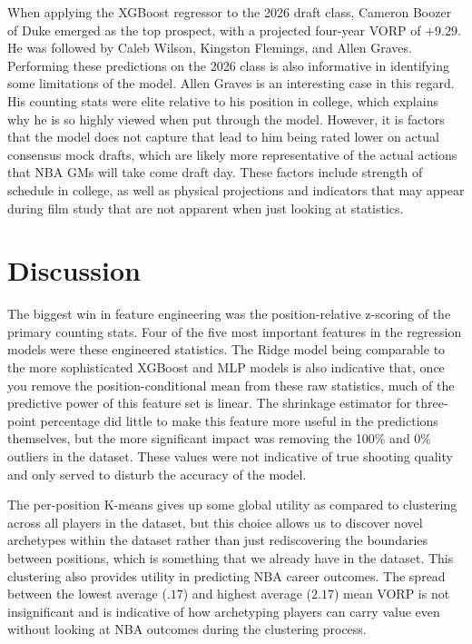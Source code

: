 \documentclass[conference]{IEEEtran}
\begin{document}
When applying the XGBoost regressor to the 2026 draft class, Cameron Boozer of Duke emerged as the top prospect, with a projected four-year VORP of $+9.29$. He was followed by Caleb Wilson, Kingston Flemings, and Allen Graves. Performing these predictions on the 2026 class is also informative in identifying some limitations of the model. Allen Graves is an interesting case in this regard. His counting stats were elite relative to his position in college, which explains why he is so highly viewed when put through the model. However, it is factors that the model does not capture that lead to him being rated lower on actual consensus mock drafts, which are likely more representative of the actual actions that NBA GMs will take come draft day. These factors include strength of schedule in college, as well as physical projections and indicators that may appear during film study that are not apparent when just looking at statistics.

\section{Discussion}

The biggest win in feature engineering was the position-relative z-scoring of the primary counting stats. Four of the five most important features in the regression models were these engineered statistics. The Ridge model being comparable to the more sophisticated XGBoost and MLP models is also indicative that, once you remove the position-conditional mean from these raw statistics, much of the predictive power of this feature set is linear. The shrinkage estimator for three-point percentage did little to make this feature more useful in the predictions themselves, but the more significant impact was removing the 100\% and 0\% outliers in the dataset. These values were not indicative of true shooting quality and only served to disturb the accuracy of the model.

The per-position K-means gives up some global utility as compared to clustering across all players in the dataset, but this choice allows us to discover novel archetypes within the dataset rather than just rediscovering the boundaries between positions, which is something that we already have in the dataset. This clustering also provides utility in predicting NBA career outcomes. The spread between the lowest average ($.17$) and highest average ($2.17$) mean VORP is not insignificant and is indicative of how archetyping players can carry value even without looking at NBA outcomes during the clustering process.
\end{document}
